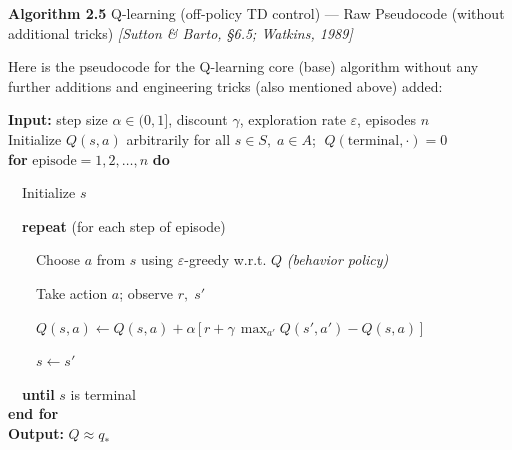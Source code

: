 \documentclass[11pt]{article}
\begin{document}
    \label{pseudo-2-5}

    \begin{pseudobox}

\textbf{Algorithm 2.5} Q-learning (off-policy TD control) --- Raw
Pseudocode (without additional tricks) \emph{{[}Sutton \& Barto, §6.5;
Watkins, 1989{]}}

\tcbline

Here is the pseudocode for the Q-learning core (base) algorithm without
any further additions and engineering tricks (also mentioned above)
added:

\textbf{Input:} step size \(\alpha \in (0, 1]\), discount \(\gamma\),
exploration rate \(\varepsilon\), episodes \(n\)\\
Initialize \(Q(s, a)\) arbitrarily for all \(s \in S,\; a \in A\);
\(\;Q(\text{terminal}, \cdot) = 0\)\\
\textbf{for} \(\text{episode} = 1, 2, \ldots, n\) \textbf{do}\\
\strut ~~Initialize \(s\)\\
\strut ~~\textbf{repeat} (for each step of episode)\\
\strut ~~~~Choose \(a\) from \(s\) using \(\varepsilon\)-greedy w.r.t.
\(Q\) \emph{(behavior policy)}\\
\strut ~~~~Take action \(a\); observe \(r,\; s'\)\\
\strut ~~~~\(Q(s, a) \leftarrow Q(s, a) + \alpha\,\bigl[\, r + \gamma\, \max_{a'} Q(s', a') - Q(s, a) \,\bigr]\)\\
\strut ~~~~\(s \leftarrow s'\)\\
\strut ~~\textbf{until} \(s\) is terminal\\
\textbf{end for}\\
\textbf{Output:} \(Q \approx q_{*}\)

\end{pseudobox}
\end{document}
